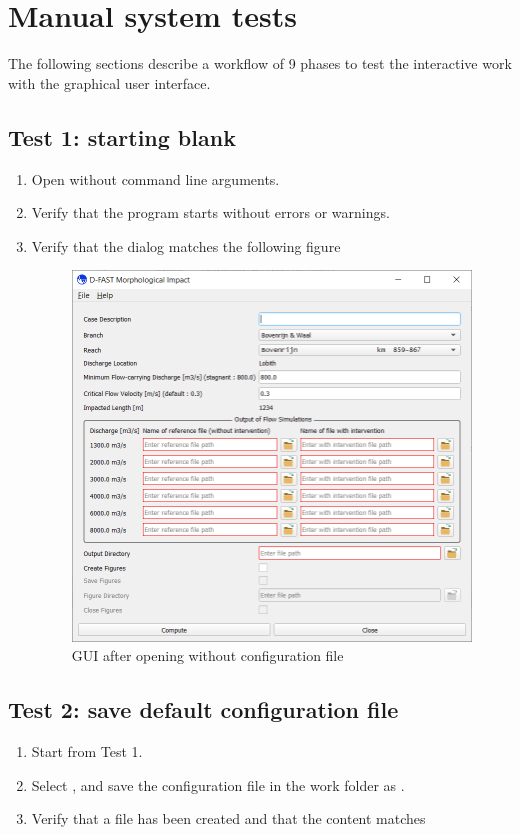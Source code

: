 \section{Manual system tests} \label{Sec:GuiTests}
The following sections describe a workflow of 9 phases to test the interactive work with the graphical user interface.

\subsection{Test 1: starting blank}
\begin{enumerate}
\item Open \dfastmi without command line arguments.
\item Verify that the program starts without errors or warnings.
\item Verify that the dialog matches the following figure
\begin{figure}[H]
\center
\includegraphics[width=12cm]{figures/main_dialog.png}
\caption{GUI after opening without configuration file}
\label{fig:test1.png}
\end{figure}
\end{enumerate}

\subsection{Test 2: save default configuration file}
\begin{enumerate}
\item Start from Test 1.
\item Select  \textrightarrow {}, and save the configuration file in the work folder as .
\item Verify that a file  has been created and that the content matches

\end{enumerate}

